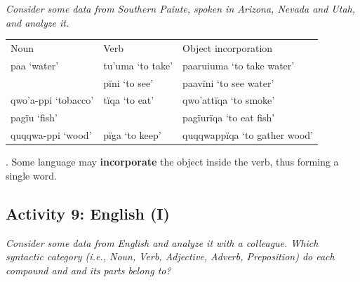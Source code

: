 \documentclass[11pt, oneside]{article}   	%
\begin{document}
{\itshape Consider some data from Southern Paiute, spoken in Arizona, Nevada and Utah, and analyze it.}

\begin{center}
\begin{tabular}{l l l}
Noun	&	Verb	& 	Object incorporation \\
paa `water'	&	tu'uma `to take'	&	paaruiuma `to take water' \\
			&	pïni `to see'		&	paavïni `to see water' \\
qwo'a-ppi `tobacco'  &	tïqa `to eat'	&	qwo'attïqa `to smoke' \\
pagïu `fish'	&						&	pagïurïqa `to eat fish' \\
quqqwa-ppi `wood' &	pïga `to keep' 	&	quqqwappïqa `to gather wood' \\
\end{tabular}
\end{center}

\ex. Some language may {\bfseries incorporate} the object inside the verb, thus forming a single word.

\subsection{Activity 9: English (I)}

{\itshape Consider some data from English and analyze it with a colleague. Which syntactic category (i.e., Noun, Verb, Adjective, Adverb, Preposition) do each compound and and its parts belong to? }
\end{document}
